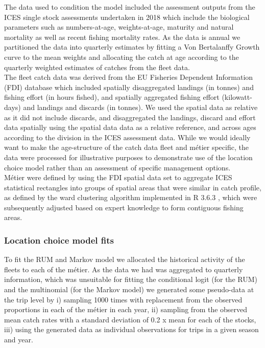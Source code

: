 \documentclass[12pt, halfline, a4paper]{ouparticle}
\begin{document}
The data used to condition the model included the assessment outputs from the
ICES single stock assessments undertaken in 2018 \citep{ICES2018} which include
the biological parameters such as numbers-at-age, weights-at-age, maturity and
natural mortality as well as recent fishing mortality rates. As the data is
annual we partitioned the data into quarterly estimates by fitting a Von
Bertalanffy Growth curve to the mean weights and allocating the catch at age
according to the quarterly weighted estimates of catches from the fleet data.
\\

The fleet catch data was derived from the EU Fisheries Dependent Information
(FDI) database \citep{STECF2017} which included spatially disaggregated
landings (in tonnes) and fishing effort (in hours fished), and spatially
aggregated fishing effort (kilowatt-days) and landings and discards (in
tonnes). We used the spatial data as relative as it did not include discards,
and disaggregated the landings, discard and effort data spatially using the
spatial data data as a relative reference, and across ages according to the
division in the ICES assessment data. While we would ideally want to make the
age-structure of the catch data fleet and métier specific, the data were
processed for illustrative purposes to demonstrate use of the location choice
model rather than an assessment of specific management options. \\

Métier were defined by using the FDI spatial data set to aggregate ICES
statistical rectangles into groups of spatial areas that were similar in catch
profile, as defined by the ward clustering algorithm implemented in R 3.6.3
\citep{Team2020}, which were subsequently adjusted based on expert knowledge to
form contiguous fishing areas. \\ 

\subsubsection{Location choice model fits}

To fit the RUM and Markov model we allocated the historical activity of the
fleets to each of the métier. As the data we had was aggregated to quarterly
information, which was unsuitable for fitting the conditional logit (for the
RUM) and the multinomial (for the Markov model) we generated some pseudo-data
at the trip level by i) sampling 1000 times with replacement from the observed
proportions in each of the métier in each year, ii) sampling from the observed
mean catch rates with a standard deviation of 0.2 x mean for each of the
stocks, iii) using the generated data as individual observations for trips in a
given season and year.  \\
\end{document}
